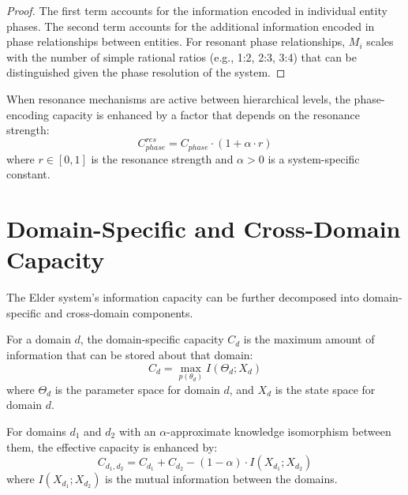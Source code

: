 \begin{proof}
The first term accounts for the information encoded in individual entity phases. The second term accounts for the additional information encoded in phase relationships between entities. For resonant phase relationships, $M_i$ scales with the number of simple rational ratios (e.g., 1:2, 2:3, 3:4) that can be distinguished given the phase resolution of the system.
\end{proof}

\begin{corollary}
When resonance mechanisms are active between hierarchical levels, the phase-encoding capacity is enhanced by a factor that depends on the resonance strength:
\begin{equation}
C_{phase}^{res} = C_{phase} \cdot (1 + \alpha \cdot r)
\end{equation}
where $r \in [0, 1]$ is the resonance strength and $\alpha > 0$ is a system-specific constant.
\end{corollary}

\section{Domain-Specific and Cross-Domain Capacity}

The Elder system's information capacity can be further decomposed into domain-specific and cross-domain components.

\begin{definition}
For a domain $d$, the domain-specific capacity $C_d$ is the maximum amount of information that can be stored about that domain:
\begin{equation}
C_d = \max_{p(\theta_d)} I(\Theta_d; X_d)
\end{equation}
where $\Theta_d$ is the parameter space for domain $d$, and $X_d$ is the state space for domain $d$.
\end{definition}

\begin{theorem}
For domains $d_1$ and $d_2$ with an $\alpha$-approximate knowledge isomorphism between them, the effective capacity is enhanced by:
\begin{equation}
C_{d_1,d_2} = C_{d_1} + C_{d_2} - (1 - \alpha) \cdot I(X_{d_1}; X_{d_2})
\end{equation}
where $I(X_{d_1}; X_{d_2})$ is the mutual information between the domains.
\end{theorem}

